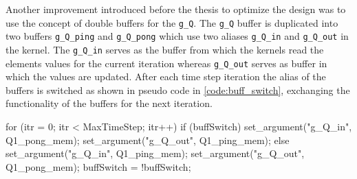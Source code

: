 Another improvement introduced before the thesis
to optimize the design was to use the concept of double buffers for the \texttt{g\_Q}.
The \texttt{g\_Q} buffer is duplicated into two buffers \texttt{g\_Q\_ping} and \texttt{g\_Q\_pong}
which use two aliases \texttt{g\_Q\_in} and \texttt{g\_Q\_out} in the kernel. The \texttt{g\_Q\_in}
serves as the buffer from which the kernels read the elements values for the current iteration whereas
\texttt{g\_Q\_out} serves as buffer in which the values
are updated. After each time step iteration the alias of the buffers is switched as shown
in pseudo code in \ref{code:buff_switch}, exchanging the functionality of the buffers for the next iteration.
\begin{CppCode}[caption=Buffer switching for double buffers in each iteration, frame=tlrb, label=code:buff_switch, float]
for (itr = 0; itr < MaxTimeStep; itr++)
{
    if (buffSwitch)
    {
        set_argument("g_Q_in", Q1_pong_mem);
        set_argument("g_Q_out", Q1_ping_mem);
    }
    else
    {
        set_argument("g_Q_in", Q1_ping_mem);
        set_argument("g_Q_out", Q1_pong_mem);
    }
    buffSwitch = !buffSwitch;
}
\end{CppCode}

